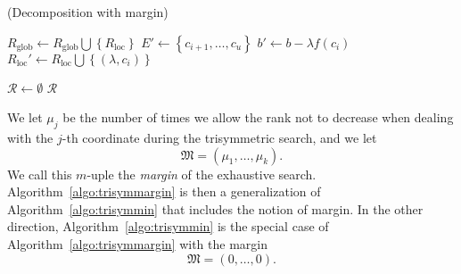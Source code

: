 \begin{algorithm}
  \caption{(Decomposition with margin)}\label{algo:decompmargin}
  \begin{algorithmic}[1]

    \State $R_\text{glob}\gets R_\text{glob}\bigcup\left\{R_\text{loc}\right\}$
    \State {}
   \Else
   \State $E'\gets\left\{ c_{i+1}, \dots, c_u \right\}$
    \State $b'\gets b-\lambda f(c_i)$
    \State $R_\text{loc}'\gets R_\text{loc}\bigcup\left\{ (\lambda, c_i)
    \right\}$
    \State {}
    \Else
    \State {}
    \EndIf
    \EndFor
    \EndFor
    \EndIf
    \EndIf
    \EndProcedure

    \State $\mathcal R\gets\emptyset$
    \State {}
    \State \Return $\mathcal R$
  \end{algorithmic}
\end{algorithm}
We let $\mu_j$ be the number of times we allow the rank not to decrease when
dealing with the $j$-th coordinate during the trisymmetric search, and we let
\[
  \mathfrak M=(\mu_1, \dots, \mu_k).
\]
We call this $m$-uple the \emph{margin} of the exhaustive search.
Algorithm~\ref{algo:trisymmargin} is then a generalization of
Algorithm~\ref{algo:trisymmin} that includes the notion of margin. In the other
direction, Algorithm~\ref{algo:trisymmin} is the special case of
Algorithm~\ref{algo:trisymmargin} with the margin
\[
  \mathfrak M = (0, \dots, 0).
\]
